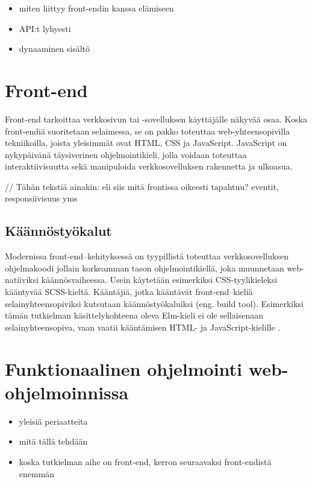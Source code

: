 \begin{itemize}
  \item miten liittyy front-endin kanssa elämiseen
  \item API:t lyhyesti
  \item dynaaminen sisältö
\end{itemize}

\section{Front-end}
Front-end tarkoittaa verkkosivun tai -sovelluksen käyttäjälle näkyvää osaa. Koska front-endiä suoritetaan selaimessa,
se on pakko toteuttaa web-yhteensopivilla tekniikoilla, joista yleisimmät ovat HTML, CSS ja JavaScript. JavaScript on
nykypäivänä täysiverinen ohjelmointikieli, jolla voidaan toteuttaa interaktiivisuutta sekä manipuloida verkkosovelluksen
rakennetta ja ulkoasua. \cite{fullstackdeveloper}

// Tähän tekstiä ainakin: eli siis mitä frontissa oikeesti tapahtuu? eventit, responsiivisuus yms

\subsection{Käännöstyökalut}
Modernissa front-end–kehityksessä on tyypillistä toteuttaa verkkosovelluksen ohjelmakoodi jollain korkeamman tason
ohjelmointikiellä, joka muunnetaan web-natiiviksi käännösvaiheessa. Usein käytetään esimerkiksi CSS-tyylikieleksi
kääntyvää SCSS-kieltä. Kääntäjiä, jotka kääntävät front-end–kieliä selainyhteensopiviksi kutsutaan käännöstyökaluiksi
(eng. build tool). Esimerkiksi tämän tutkielman käsittelykohteena oleva Elm-kieli ei ole sellaisenaan
selainyhteensopiva, vaan vaatii kääntämisen HTML- ja JavaScript-kielille \cite{elmlang}. \cite{fullstackdeveloper}

\section{Funktionaalinen ohjelmointi web-ohjelmoinnissa}

\begin{itemize}
  \item yleisiä periaatteita
  \item mitä tällä tehdään
  \item koska tutkielman aihe on front-end, kerron seuraavaksi front-endistä enemmän
\end{itemize}


